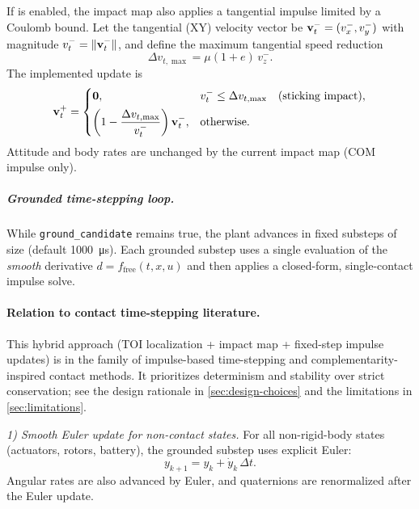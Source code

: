 If  is enabled, the impact map also applies a tangential impulse limited by a Coulomb bound. Let the tangential (XY) velocity vector be \(\mathbf{v}^{-}_{t}=(v^{-}_{x},v^{-}_{y})\) with magnitude \(v^{-}_{t}=\|\mathbf{v}^{-}_{t}\|\), and define the maximum tangential speed reduction
\begin{equation}
  \Delta v_{t,\max} = \mu(1+e)\,v^{-}_{z}.
\end{equation}
The implemented update is
\begin{equation}
  \mathbf{v}^{+}_{t} =
  \begin{cases}
    \mathbf{0}, & v^{-}_{t} \le \Delta v_{t,\max} \quad (\text{sticking impact}),\\[4pt]
    \left(1-\dfrac{\Delta v_{t,\max}}{v^{-}_{t}}\right)\mathbf{v}^{-}_{t}, & \text{otherwise}.
  \end{cases}
\end{equation}
Attitude and body rates are unchanged by the current impact map (COM impulse only).

\subparagraph{Grounded time-stepping loop.}
While \texttt{ground\_candidate} remains true, the plant advances in fixed substeps of size  (default \SI{1000}{\micro\second}). Each grounded substep uses a single evaluation of the \emph{smooth} derivative \(d = f_{\mathrm{free}}(t,x,u)\) and then applies a closed-form, single-contact impulse solve.

\paragraph{Relation to contact time-stepping literature.}
This hybrid approach (TOI localization + impact map + fixed-step impulse updates) is in the family of impulse-based time-stepping and complementarity-inspired contact methods. It prioritizes determinism and stability over strict conservation; see the design rationale in \cref{sec:design-choices} and the limitations in \cref{sec:limitations}.

\emph{1) Smooth Euler update for non-contact states.}
For all non-rigid-body states (actuators, rotors, battery), the grounded substep uses explicit Euler:
\begin{equation}
  y_{k+1} = y_k + \dot{y}_k\,\Delta t.
\end{equation}
Angular rates are also advanced by Euler, and quaternions are renormalized after the Euler update.

